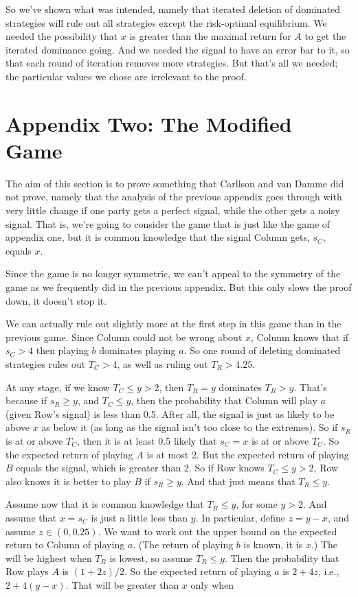 So we've shown what was intended, namely that iterated deletion of dominated strategies will rule out all strategies except the risk-optimal equilibrium. We needed the possibility that $x$ is greater than the maximal return for $A$ to get the iterated dominance going. And we needed the signal to have an error bar to it, so that each round of iteration removes more strategies. But that's all we needed; the particular values we chose are irrelevant to the proof.

\section*{Appendix Two: The Modified Game}
\label{appendixtwo:themodifiedgame}

The aim of this section is to prove something that Carllson and van Damme did not prove, namely that the analysis of the previous appendix goes through with very little change if one party gets a perfect signal, while the other gets a noisy signal. That is, we're going to consider the game that is just like the game of appendix one, but it is common knowledge that the signal Column gets, $s_C$, equals $x$. 

Since the game is no longer symmetric, we can't appeal to the symmetry of the game as we frequently did in the previous appendix. But this only slows the proof down, it doesn't stop it.

We can actually rule out slightly more at the first step in this game than in the previous game. Since Column could not be wrong about $x$, Column knows that if $s_C > 4$ then playing $b$ dominates playing $a$. So one round of deleting dominated strategies rules out $T_C > 4$, as well as ruling out $T_R > 4.25$.

At any stage, if we know $T_C \leq y > 2$, then $T_R = y$ dominates $T_R > y$. That's because if $s_R \geq y$, and $T_C \leq y$, then the probability that Column will play $a$ (given Row's signal) is less than 0.5. After all, the signal is just as likely to be above $x$ as below it (as long as the signal isn't too close to the extremes). So if $s_R$ is at or above $T_C$, then it is at least 0.5 likely that $s_C = x$ is at or above $T_C$. So the expected return of playing $A$ is at most 2. But the expected return of playing $B$ equals the signal, which is greater than 2. So if Row knows $T_C \leq y > 2$, Row also knows it is better to play $B$ if $s_R \geq y$. And that just means that $T_R \leq y$.

Assume now that it is common knowledge that $T_R \leq y$, for some $y > 2$. And assume that $x = s_C$ is just a little less than $y$. In particular, define $z = y -x$, and assume $z \in (0, 0.25)$. We want to work out the upper bound on the expected return to Column of playing $a$. (The return of playing $b$ is known, it is $x$.) The will be highest when $T_R$ is lowest, so assume $T_R \leq y$. Then the probability that Row plays $A$ is $(1 + 2z)/2$. So the expected return of playing $a$ is $2 + 4z$, i.e., $2 + 4(y - x)$. That will be greater than $x$ only when 

